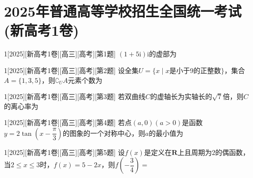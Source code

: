 
\section{2025年普通高等学校招生全国统一考试(新高考1卷)}


\begin{example}{1}[2025][新高考1卷][高三][高考][第1题]
$(1+5\text{i})\text{i}$的虚部为\blankbox
\begin{choices}
\end{choices}
\end{example}

\begin{example}{1}[2025][新高考1卷][高三][高考][第2题]
设全集$U=\{x\mid x$是小于9的正整数$\}$，集合$A=\{1,3,5\}$，则$\complement_U A$元素个数为\blankbox
\begin{choices}
\end{choices}
\end{example}

\begin{example}{1}[2025][新高考1卷][高三][高考][第3题]
若双曲线$C$的虚轴长为实轴长的$\sqrt{7}$倍，则$C$的离心率为\blankbox
\begin{choices}
\end{choices}
\end{example}

\begin{example}{1}[2025][新高考1卷][高三][高考][第4题]
若点$(a,0)(a>0)$是函数$y=2\tan\left(x-\dfrac{\pi}{3}\right)$的图象的一个对称中心，则$a$的最小值为\blankbox
\begin{choices}
\end{choices}
\end{example}

\begin{example}{1}[2025][新高考1卷][高三][高考][第5题]
设$f(x)$是定义在$\mathbf{R}$上且周期为$2$的偶函数，当$2\le x\le 3$时，$f(x)=5-2x$，则$f\left(-\dfrac{3}{4}\right)=$\blankbox
\begin{choices}
\end{choices}
\end{example}

